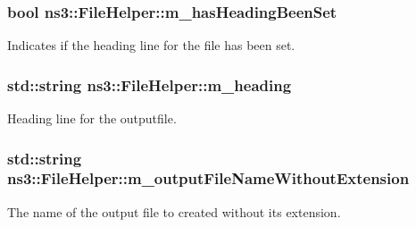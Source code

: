 \subsubsection[{\texorpdfstring{m\+\_\+has\+Heading\+Been\+Set}{m_hasHeadingBeenSet}}]{\setlength{\rightskip}{0pt plus 5cm}bool ns3\+::\+File\+Helper\+::m\+\_\+has\+Heading\+Been\+Set\hspace{0.3cm}{\ttfamily [private]}}\hypertarget{classns3_1_1FileHelper_a83e6bfa9d7f2ba769dee7d2b610f957d}{}\label{classns3_1_1FileHelper_a83e6bfa9d7f2ba769dee7d2b610f957d}


Indicates if the heading line for the file has been set. 

\subsubsection[{\texorpdfstring{m\+\_\+heading}{m_heading}}]{\setlength{\rightskip}{0pt plus 5cm}std\+::string ns3\+::\+File\+Helper\+::m\+\_\+heading\hspace{0.3cm}{\ttfamily [private]}}\hypertarget{classns3_1_1FileHelper_a60cc5ac5116788fd230701dc1b9d0441}{}\label{classns3_1_1FileHelper_a60cc5ac5116788fd230701dc1b9d0441}


Heading line for the outputfile. 

\subsubsection[{\texorpdfstring{m\+\_\+output\+File\+Name\+Without\+Extension}{m_outputFileNameWithoutExtension}}]{\setlength{\rightskip}{0pt plus 5cm}std\+::string ns3\+::\+File\+Helper\+::m\+\_\+output\+File\+Name\+Without\+Extension\hspace{0.3cm}{\ttfamily [private]}}\hypertarget{classns3_1_1FileHelper_a65ce7e46c43b018fe5e648d179e7b52e}{}\label{classns3_1_1FileHelper_a65ce7e46c43b018fe5e648d179e7b52e}


The name of the output file to created without its extension. 

